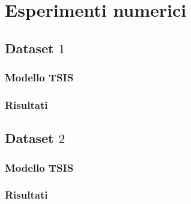 
\chapter{Esperimenti numerici}
\label{cap:esperimenti}

\omissis{}

\section{Dataset \texorpdfstring{$1$}{1}}
\omissis{}

\subsection{Modello TSIS}
\omissis{}

\subsection{Risultati}
\omissis{}

\section{Dataset \texorpdfstring{$2$}{2}}
\omissis{}

\subsection{Modello TSIS}
\omissis{}

\subsection{Risultati}
\omissis{}
